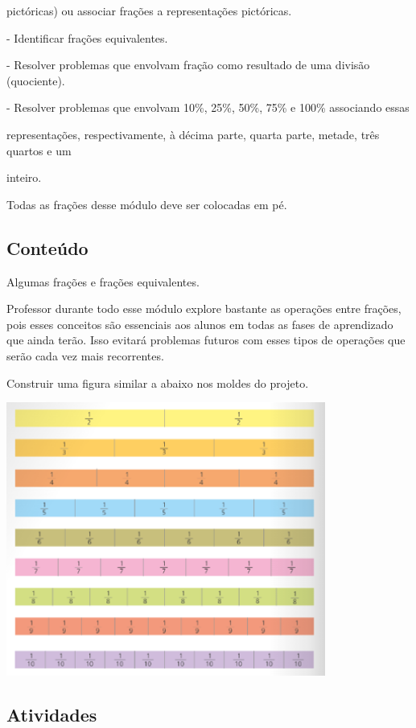 pictóricas) ou associar frações a representações pictóricas.

- Identificar frações equivalentes.

- Resolver problemas que envolvam fração como resultado de uma divisão
(quociente).

- Resolver problemas que envolvam 10\%, 25\%, 50\%, 75\% e 100\%
associando essas

representações, respectivamente, à décima parte, quarta parte, metade,
três quartos e um

inteiro.

Todas as frações desse módulo deve ser colocadas em pé.

\subsection{Conteúdo}\label{conteuxfado-8}

Algumas frações e frações equivalentes.

Professor durante todo esse módulo explore bastante as operações entre
frações, pois esses conceitos são essenciais aos alunos em todas as
fases de aprendizado que ainda terão. Isso evitará problemas futuros com
esses tipos de operações que serão cada vez mais recorrentes.

Construir uma figura similar a abaixo nos moldes do projeto.

\includegraphics[width=4.12179in,height=3.54348in]{media/image106.png}

\subsection{Atividades}\label{atividades-8}

